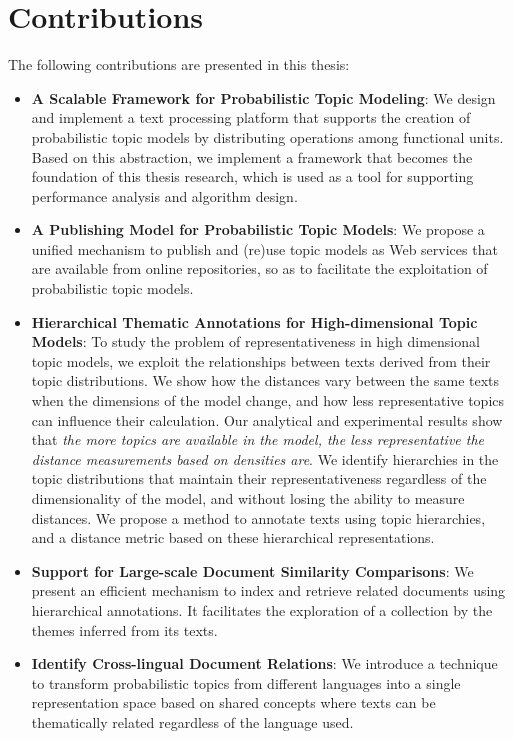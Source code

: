 \section{Contributions}

The following contributions are presented in this thesis:

\begin{itemize}
\item \textbf{A Scalable Framework for Probabilistic Topic Modeling}: We design and implement a text processing platform that supports the creation of probabilistic topic models by distributing operations among functional units. Based on this abstraction, we implement a framework that becomes the foundation of this thesis research, which is used as a tool for supporting performance analysis and algorithm design.
\item \textbf{A Publishing Model for Probabilistic Topic Models}: We propose a unified mechanism to publish and (re)use topic models as Web services that are available from online repositories, so as to facilitate the exploitation of probabilistic topic models.
\item \textbf{Hierarchical Thematic Annotations for High-dimensional Topic Models}: To study the problem of representativeness in high dimensional topic models, we exploit the relationships between texts derived from their topic distributions. We show how the distances vary between the same texts when the dimensions of the model change, and how less representative topics can influence their calculation. Our analytical and experimental results show that \textit{the more topics are available in the model, the less representative the distance measurements based on densities are}. We identify hierarchies in the topic distributions that maintain their representativeness regardless of the dimensionality of the model, and without losing the ability to measure distances. We propose a method to annotate texts using topic hierarchies, and a distance metric based on these hierarchical representations.
\item \textbf{Support for Large-scale Document Similarity Comparisons}: We present an efficient mechanism to index and retrieve related documents using hierarchical annotations. It facilitates the exploration of a collection by the themes inferred from its texts.
\item \textbf{Identify Cross-lingual Document Relations}: We introduce a technique to transform probabilistic topics from different languages into a single representation space based on shared concepts where texts can be thematically related regardless of the language used.
\end{itemize}

